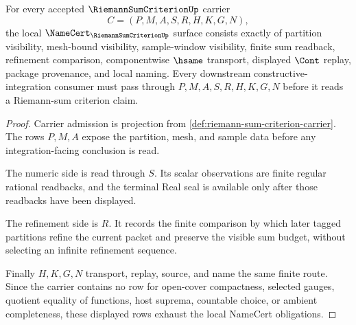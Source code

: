 \begin{theorem}
\label{thm:riemann-sum-criterion-namecert-obligations}
For every accepted $\RiemannSumCriterionUp$ carrier
$$
C=(P,M,A,S,R,H,K,G,N),
$$
the local $\NameCert_{\RiemannSumCriterionUp}$ surface consists exactly of partition visibility, mesh-bound visibility, sample-window visibility, finite sum readback, refinement comparison, componentwise $\hsame$ transport, displayed $\Cont$ replay, package provenance, and local naming. Every downstream constructive-integration consumer must pass through $P,M,A,S,R,H,K,G,N$ before it reads a Riemann-sum criterion claim.
\end{theorem}
\begin{proof}
Carrier admission is projection from \autoref{def:riemann-sum-criterion-carrier}. The rows $P,M,A$ expose the partition, mesh, and sample data before any integration-facing conclusion is read.

The numeric side is read through $S$. Its scalar observations are finite regular rational readbacks, and the terminal Real seal is available only after those readbacks have been displayed.

The refinement side is $R$. It records the finite comparison by which later tagged partitions refine the current packet and preserve the visible sum budget, without selecting an infinite refinement sequence.

Finally $H,K,G,N$ transport, replay, source, and name the same finite route. Since the carrier contains no row for open-cover compactness, selected gauges, quotient equality of functions, host suprema, countable choice, or ambient completeness, these displayed rows exhaust the local NameCert obligations.
\end{proof}



